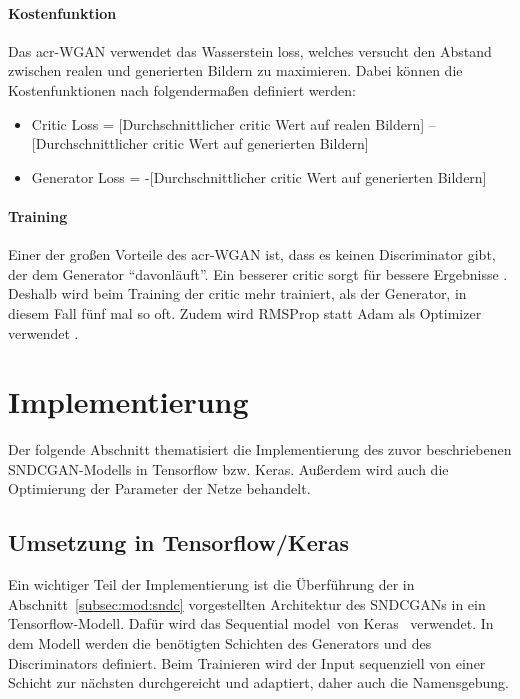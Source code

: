  \paragraph{Kostenfunktion} Das \gls{acr-WGAN} verwendet das Wasserstein loss, welches versucht den Abstand zwischen realen und generierten Bildern zu maximieren. Dabei können die Kostenfunktionen nach \cite{brownlee_how_2019} folgendermaßen definiert werden:
 \begin{itemize}
 	\item Critic Loss = [Durchschnittlicher critic Wert auf realen Bildern] – [Durchschnittlicher critic Wert auf generierten Bildern]
 	\item Generator Loss = -[Durchschnittlicher critic Wert auf generierten Bildern]
 \end{itemize}

\paragraph{Training} Einer der großen Vorteile des \gls{acr-WGAN} ist, dass es keinen Discriminator gibt, der dem Generator \enquote{davonläuft}. Ein besserer critic sorgt für bessere Ergebnisse \cite[S. 8]{arjovsky_wasserstein_2017}. Deshalb wird beim Training der critic mehr trainiert, als der Generator, in diesem Fall fünf mal so oft. Zudem wird RMSProp statt Adam als Optimizer verwendet \cite[S. 12]{arjovsky2017wasserstein}.
 
  \section{Implementierung} %
  \label{sec:gen_impl}
 
 Der folgende Abschnitt thematisiert die Implementierung des zuvor beschriebenen SNDCGAN-Modells in Tensorflow bzw. Keras. Außerdem wird auch die Optimierung der Parameter der Netze behandelt.
 
 \subsection{Umsetzung in Tensorflow/Keras}\label{subsec:imp:sndc}
 
 Ein wichtiger Teil der Implementierung ist die Überführung der in Abschnitt~\ref{subsec:mod:sndc} vorgestellten Architektur des SNDCGANs in ein Tensorflow-Modell. Dafür wird das \glqq Sequential model\grqq\ von Keras~\cite{keras:SequentialModel} verwendet. In dem Modell werden die benötigten Schichten des Generators und des Discriminators definiert. Beim Trainieren wird der Input sequenziell von einer Schicht zur nächsten durchgereicht und adaptiert, daher auch die Namensgebung.  
 
